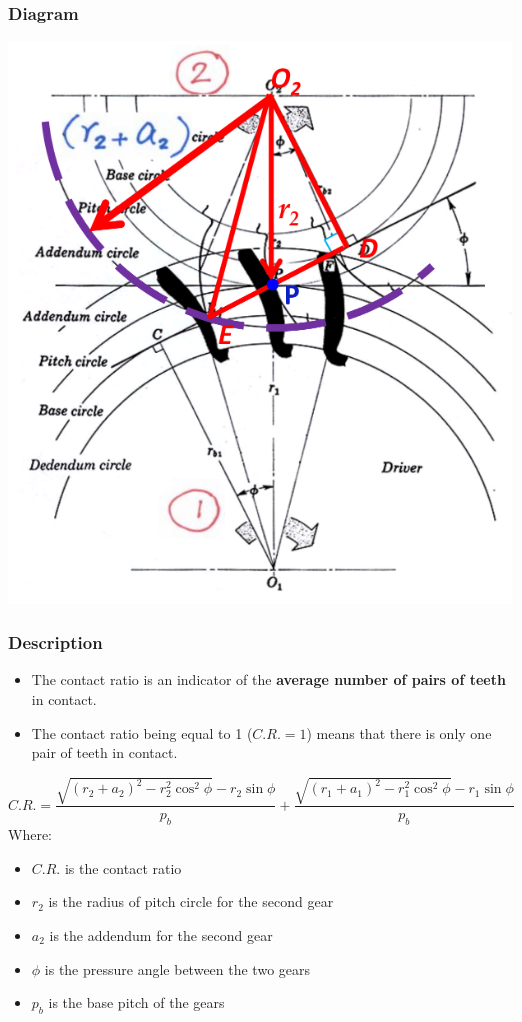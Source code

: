 \documentclass[11pt]{article}
\begin{document}
\subsubsection{Diagram}
\label{sec:orgf115952}
\begin{center}
\includegraphics[width=.9\linewidth]{./images/contact-ratio-diagram.png}
\end{center}
\subsubsection{Description}
\label{sec:org4ce5d36}
\begin{itemize}
\item The contact ratio is an indicator of the \textbf{average number of pairs of teeth} in contact.
\item The contact ratio being equal to 1 (\(C.R. = 1\)) means that there is only one pair of teeth in contact.
\end{itemize}
\[C.R. = \frac{\sqrt{(r_2 + a_2)^2 - r_2^2 \cos^2 \phi} - r_2 \sin \phi}{p_b} + \frac{\sqrt{(r_1 + a_1)^2 - r_1^2 \cos^2 \phi} - r_1 \sin \phi}{p_b}\]
Where:
\begin{itemize}
\item \(C.R.\) is the contact ratio
\item \(r_2\) is the radius of pitch circle for the second gear
\item \(a_2\) is the addendum for the second gear
\item \(\phi\) is the pressure angle between the two gears
\item \(p_b\) is the base pitch of the gears
\end{itemize}
\end{document}

